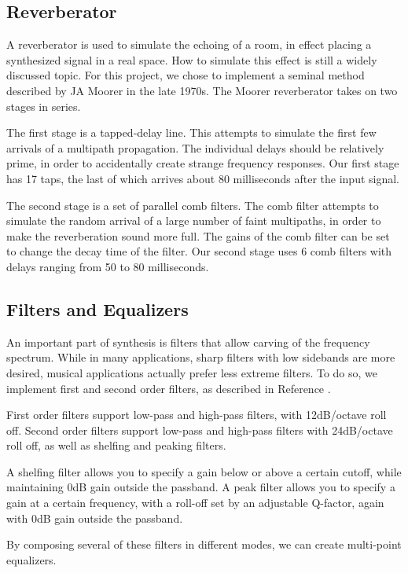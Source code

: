 \documentclass[letterpaper,12pt]{article}
\begin{document}
\subsection{Reverberator}

A reverberator is used to simulate the echoing of a room, in effect placing a synthesized signal in a real space. How to simulate this effect is still a widely discussed topic. For this project, we chose to implement a seminal method described by JA Moorer in the late 1970s\cite{moorer}. The Moorer reverberator takes on two stages in series.

The first stage is a tapped-delay line. This attempts to simulate the first few arrivals of a multipath propagation. The individual delays should be relatively prime, in order to accidentally create strange frequency responses. Our first stage has 17 taps, the last of which arrives about 80 milliseconds after the input signal.

The second stage is a set of parallel comb filters. The comb filter attempts to simulate the random arrival of a large number of faint multipaths, in order to make the reverberation sound more full. The gains of the comb filter can be set to change the decay time of the filter. Our second stage uses 6 comb filters with delays ranging from 50 to 80 milliseconds.


\subsection{Filters and Equalizers}

An important part of synthesis is filters that allow carving of the frequency spectrum. While in many applications, sharp filters with low sidebands are more desired, musical applications actually prefer less extreme filters. To do so, we implement first and second order filters, as described in Reference \cite{dafx}.

First order filters support low-pass and high-pass filters, with 12dB/octave roll off. Second order filters support low-pass and high-pass filters with 24dB/octave roll off, as well as shelfing and peaking filters.

A shelfing filter allows you to specify a gain below or above a certain cutoff, while maintaining 0dB gain outside the passband. A peak filter allows you to specify a gain at a certain frequency, with a roll-off set by an adjustable Q-factor, again with 0dB gain outside the passband.

By composing several of these filters in different modes, we can create multi-point equalizers.
\end{document}
